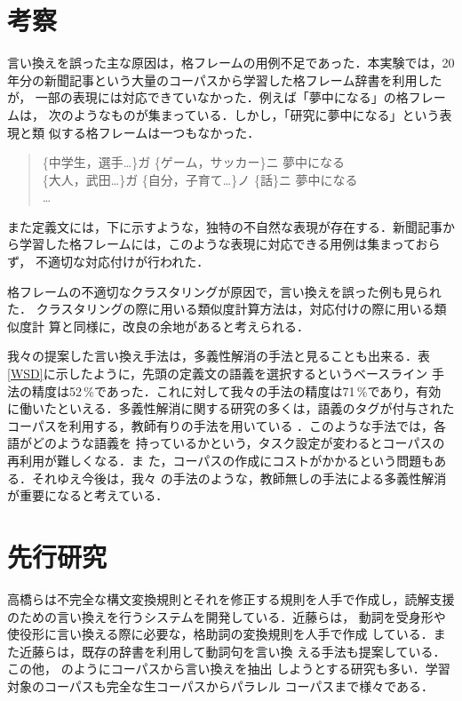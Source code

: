 \section{考察}

言い換えを誤った主な原因は，格フレームの用例不足であった．本実験では，20
年分の新聞記事という大量のコーパスから学習した格フレーム辞書を利用したが，
一部の表現には対応できていなかった．例えば「夢中になる」の格フレームは，
次のようなものが集まっている．しかし，「研究に夢中になる」という表現と類
似する格フレームは一つもなかった．

\begin{quote}
 \vspace{5pt}
 \{中学生，選手\dots\}ガ \{ゲーム，サッカー\}ニ 夢中になる\\
 \{大人，武田\dots\}ガ \{自分，子育て\dots\}ノ \{話\}ニ 夢中になる\\
 \dots
 \vspace{5pt}
\end{quote}

また定義文には，下に示すような，独特の不自然な表現が存在する．新聞記事か
ら学習した格フレームには，このような表現に対応できる用例は集まっておらず，
不適切な対応付けが行われた．


格フレームの不適切なクラスタリングが原因で，言い換えを誤った例も見られた．
クラスタリングの際に用いる類似度計算方法は，対応付けの際に用いる類似度計
算と同様に，改良の余地があると考えられる．

我々の提案した言い換え手法は，多義性解消の手法と見ることも出来る．表
\ref{WSD}に示したように，先頭の定義文の語義を選択するというベースライン
手法の精度は52\,\%であった．これに対して我々の手法の精度は71\,\%であり，有効
に働いたといえる．多義性解消に関する研究の多くは，語義のタグが付与された
コーパスを利用する，教師有りの手法を用いている
\cite{SENSEVAL_J,SENSEVAL_E}．このような手法では，各語がどのような語義を
持っているかという，タスク設定が変わるとコーパスの再利用が難しくなる．ま
た，コーパスの作成にコストがかかるという問題もある．それゆえ今後は，我々
の手法のような，教師無しの手法による多義性解消が重要になると考えている．


\section{先行研究}

高橋らは不完全な構文変換規則とそれを修正する規則を人手で作成し，読解支援
のための言い換えを行うシステムを開発している\cite{Takahashi01}．近藤らは，
動詞を受身形や使役形に言い換える際に必要な，格助詞の変換規則を人手で作成
している\cite{Kondo01}．また近藤らは，既存の辞書を利用して動詞句を言い換
える手法も提案している\cite{Kondo99}．この他，
\cite{Kimura01,Torisawa01,Brazilay01}のようにコーパスから言い換えを抽出
しようとする研究も多い．学習対象のコーパスも完全な生コーパスからパラレル
コーパスまで様々である．

